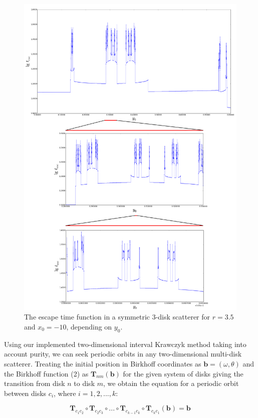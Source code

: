 \documentclass[pre, amsmath, amssymb, onecolumn, showpacs]{revtex4-1}
\begin{document}
\begin{figure}
\centering
\includegraphics*[width=470pt]{fractal-plot.png}
\caption{The escape time function in a symmetric 3-disk scatterer for $r = 3.5$ and $x_0 = -10$, depending on $y_0$. }
\label{fig02}
\end{figure}

Using our implemented two-dimensional interval Krawczyk method taking into account purity, we can seek periodic orbits in any two-dimensional multi-disk scatterer. Treating the initial position in Birkhoff coordinates as $\textbf{b} = (\omega, \theta)$ and the Birkhoff function (2) as $\textbf{T}_{nm}(\textbf{b})$ for the given system of disks giving the transition from disk $n$ to disk $m$, we obtain the equation for a periodic orbit between disks $c_i$, where $i = 1, 2, ..., k$:

\begin{equation}
\textbf{T}_{c_1 c_2} \circ \textbf{T}_{c_2 c_3} \circ ... \circ \textbf{T}_{c_{k-1} c_k} \circ \textbf{T}_{c_k c_1} (\textbf{b}) = \textbf{b}
\end{equation}
\end{document}
